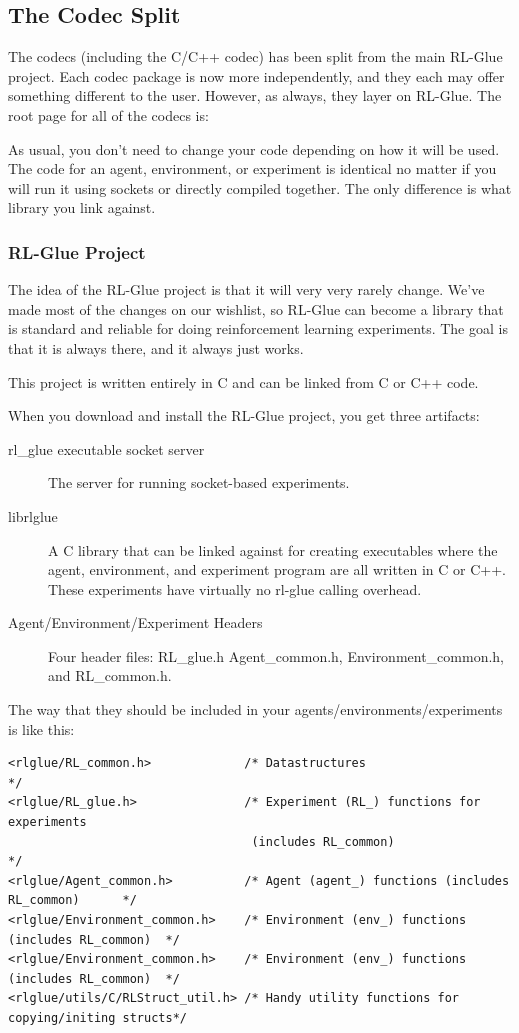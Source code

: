 \documentclass[11pt]{article}
\begin{document}
\subsection{The Codec Split}
The codecs (including the C/C++ codec) has been split from the main RL-Glue project.  Each codec package is now more independently, and they each may offer something different to the user.  However, as always, they layer on RL-Glue.  The root page for all of the codecs is:\newline
{}

As usual, you don't need to change your code depending on how it will be used.  The code for an agent, environment, or experiment is identical no matter if you will run it using sockets or directly compiled together.  The only difference is what library you link against.

\subsubsection{RL-Glue Project}
The idea of the RL-Glue project is that it will very very rarely change.  We've made most of the changes on our wishlist, so RL-Glue can become a library that is standard and reliable for doing reinforcement learning experiments.  The goal is that it is always there, and it always just works.

This project is written entirely in C and can be linked from C or C++ code.

When you download and install the RL-Glue project, you get three artifacts:
\begin{description}
	\item [rl\_glue executable socket server] The server for running socket-based experiments.
	\item [librlglue] A C library that can be linked against for creating executables where the agent, environment, and experiment program are all written in C or C++. These experiments have virtually no rl-glue calling overhead.
	\item [Agent/Environment/Experiment Headers]  Four header files: RL\_glue.h Agent\_common.h, Environment\_common.h, and RL\_common.h. 
\end{description}
 
The way that they should be included in your agents/environments/experiments is like this:
\begin{verbatim}
<rlglue/RL_common.h>             /* Datastructures                                     */
<rlglue/RL_glue.h>               /* Experiment (RL_) functions for experiments 
                                  (includes RL_common)                                 */
<rlglue/Agent_common.h>          /* Agent (agent_) functions (includes RL_common)      */
<rlglue/Environment_common.h>    /* Environment (env_) functions (includes RL_common)  */
<rlglue/Environment_common.h>    /* Environment (env_) functions (includes RL_common)  */
<rlglue/utils/C/RLStruct_util.h> /* Handy utility functions for copying/initing structs*/
\end{verbatim} 
\end{document}
